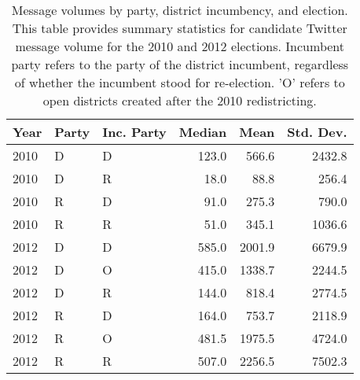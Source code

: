 \begin{table}[ht]
\centering
\begin{tabular}{lllrrr}
  \hline
Year & Party & Inc. Party & Median & Mean & Std. Dev. \\ 
  \hline
2010 & D & D & 123.0 & 566.6 & 2432.8 \\ 
  2010 & D & R & 18.0 & 88.8 & 256.4 \\ 
  2010 & R & D & 91.0 & 275.3 & 790.0 \\ 
  2010 & R & R & 51.0 & 345.1 & 1036.6 \\ 
  2012 & D & D & 585.0 & 2001.9 & 6679.9 \\ 
  2012 & D & O & 415.0 & 1338.7 & 2244.5 \\ 
  2012 & D & R & 144.0 & 818.4 & 2774.5 \\ 
  2012 & R & D & 164.0 & 753.7 & 2118.9 \\ 
  2012 & R & O & 481.5 & 1975.5 & 4724.0 \\ 
  2012 & R & R & 507.0 & 2256.5 & 7502.3 \\ 
   \hline
\end{tabular}
\caption{Message volumes by party, district incumbency, and election. This table provides summary statistics for candidate Twitter message volume for the 2010 and 2012 elections. Incumbent party refers to the party of the district incumbent, regardless of whether the incumbent stood for re-election. 'O' refers to open districts created after the 2010 redistricting.} 
\label{tab:volume-by-party-inc}
\end{table}
